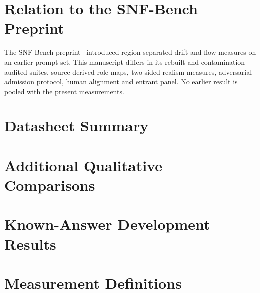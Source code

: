 \section{Relation to the SNF-Bench Preprint}
\label{app:prior}
The SNF-Bench preprint~\cite{minar2026snfbench} introduced region-separated drift and flow measures on an earlier prompt set. This manuscript differs in its rebuilt and contamination-audited suites, source-derived role maps, two-sided realism measures, adversarial admission protocol, human alignment and entrant panel. No earlier result is pooled with the present measurements. 

\section{Datasheet Summary}
\label{app:datasheet}

\section{Additional Qualitative Comparisons}
\label{app:qualitative}

\section{Known-Answer Development Results}
\label{app:known_answers}

\section{Measurement Definitions}
